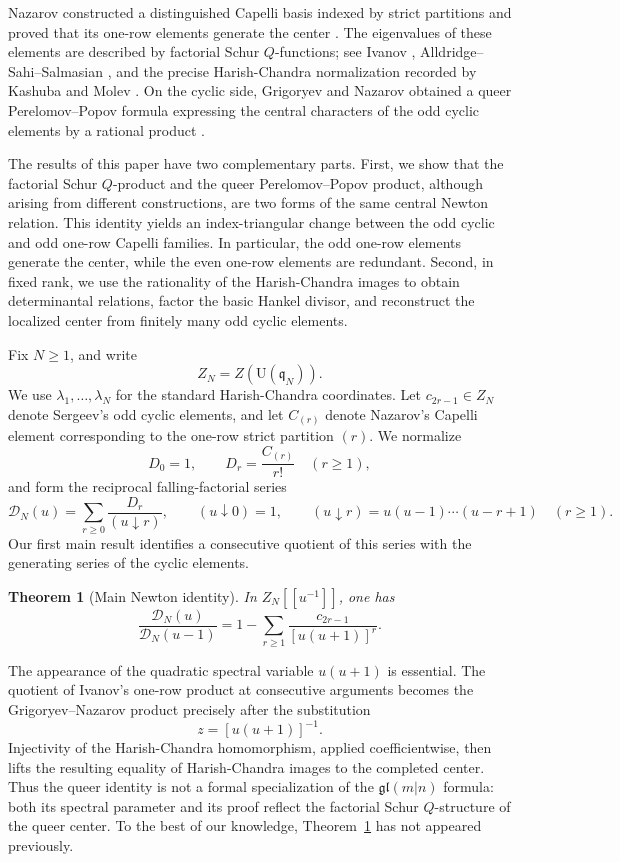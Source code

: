 \documentclass[11pt]{amsart}
\numberwithin{equation}{section}
\newtheorem{theorem}{Theorem}[section]
\theoremstyle{definition}
\theoremstyle{remark}
\newcommand{\gl}{\mathfrak{gl}}
\newcommand{\q}{\mathfrak q}
\newcommand{\U}{\mathrm U}
\newcommand{\fall}[2]{(#1\mathbin{\downarrow}#2)}
\newcommand{\calD}{\mathcal D}
\begin{document}
Nazarov constructed a distinguished Capelli basis indexed by strict
partitions and proved that its one-row elements generate the center
\cite[Proposition~4.8]{Nazarov1997}.  The eigenvalues of these elements
are described by factorial Schur \(Q\)-functions; see Ivanov
\cite{Ivanov2005}, Alldridge--Sahi--Salmasian \cite{ASS2018}, and the
precise Harish-Chandra normalization recorded by Kashuba and Molev
\cite[Remark~5.4, Equation~(5.5)]{KM2025}.  On the cyclic side,
Grigoryev and Nazarov obtained a queer Perelomov--Popov formula
expressing the central characters of the odd cyclic elements by a
rational product \cite[Section~2.2]{GN2019}.

The results of this paper have two complementary parts.  First, we show
that the factorial Schur \(Q\)-product and the queer
Perelomov--Popov product, although arising from different
constructions, are two forms of the same central Newton relation.
This identity yields an index-triangular change between the odd cyclic
and odd one-row Capelli families.  In particular, the odd one-row
elements generate the center, while the even one-row elements are
redundant.  Second, in fixed rank, we use the rationality of the
Harish-Chandra images to obtain determinantal relations, factor the
basic Hankel divisor, and reconstruct the localized center from
finitely many odd cyclic elements.

Fix \(N\geq1\), and write
\[
 Z_N=Z(\U(\q_N)).
\]
We use \(\lambda_1,\ldots,\lambda_N\) for the standard
Harish-Chandra coordinates.  Let \(c_{2r-1}\in Z_N\) denote Sergeev's
odd cyclic elements, and let \(C_{(r)}\) denote Nazarov's Capelli
element corresponding to the one-row strict partition \((r)\).  We
normalize
\[
 D_0=1,
 \qquad
 D_r=\frac{C_{(r)}}{r!}\quad(r\geq1),
\]
and form the reciprocal falling-factorial series
\[
 \calD_N(u)=\sum_{r\geq0}\frac{D_r}{\fall{u}{r}},
 \qquad
 \fall{u}{0}=1,
 \qquad
 \fall{u}{r}=u(u-1)\cdots(u-r+1)\quad(r\geq1).
\]
Our first main result identifies a consecutive quotient of this series
with the generating series of the cyclic elements.

\begin{theorem}[Main Newton identity]
\label{thm:intro-main}
In \(Z_N[[u^{-1}]]\), one has
\begin{equation}
 \boxed{
 \frac{\calD_N(u)}{\calD_N(u-1)}
 =
 1-\sum_{r\geq1}\frac{c_{2r-1}}{[u(u+1)]^r}.}
 \label{eq:intro-main}
\end{equation}
\end{theorem}

The appearance of the quadratic spectral variable \(u(u+1)\) is
essential.  The quotient of Ivanov's one-row product at consecutive
arguments becomes the Grigoryev--Nazarov product precisely after the
substitution
\[
 z=[u(u+1)]^{-1}.
\]
Injectivity of the Harish-Chandra homomorphism, applied
coefficientwise, then lifts the resulting equality of Harish-Chandra
images to the completed center.  Thus the queer identity is not a
formal specialization of the \(\gl(m|n)\) formula: both its spectral
parameter and its proof reflect the factorial Schur \(Q\)-structure of
the queer center.  To the best of our knowledge,
Theorem~\ref{thm:intro-main} has not appeared previously.
\end{document}
